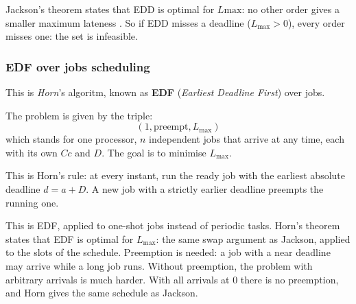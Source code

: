 \documentclass[a4paper,11pt]{article}
\begin{document}
Jackson's theorem states that EDD is optimal for $L\text{max}$: no other order gives a smaller maximum lateness . So if EDD misses a deadline ($L_\text{max} > 0$), every order misses one: the set is infeasible.

\subsubsection{EDF over jobs scheduling}

This is \textit{Horn}'s algoritm, known as \textbf{EDF} (\textit{Earliest Deadline First}) over jobs.

The problem is given by the triple:
$$
	(1, \text{preempt}, L_\text{max})
$$
which stands for one processor, $n$ independent jobs that arrive at any time, each with its own $Cc$ and $D$. The goal is to minimise $L_\text{max}$.

This is Horn's rule: at every instant, run the ready job with the earliest absolute deadline $d = a + D$.
A new job with a strictly earlier deadline preempts the running one.

This is EDF, applied to one-shot jobs instead of periodic tasks.
Horn's theorem states that EDF is optimal for $L_\text{max}$: the same swap argument as Jackson, applied to the slots of the schedule.
Preemption is needed: a job with a near deadline may arrive while a long job runs. Without preemption, the problem with arbitrary arrivals is much harder.
With all arrivals at 0 there is no preemption, and Horn gives the same schedule as Jackson.
\end{document}
